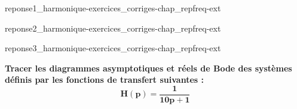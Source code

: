 \begin{center}
    {reponse1_harmonique-exercices_corriges-chap_repfreq-ext}
    
\end{center}
\begin{center}
    {reponse2_harmonique-exercices_corriges-chap_repfreq-ext}
    
\end{center}
\begin{center}
    {reponse3_harmonique-exercices_corriges-chap_repfreq-ext}
    
\end{center}
\clearpage
\textbf{Tracer les diagrammes asymptotiques et réels de Bode des systèmes 
définis par les fonctions de transfert suivantes :}
\question{}
\[
\boldsymbol{H(p) = \dfrac{1}{10p+1}}
\]
